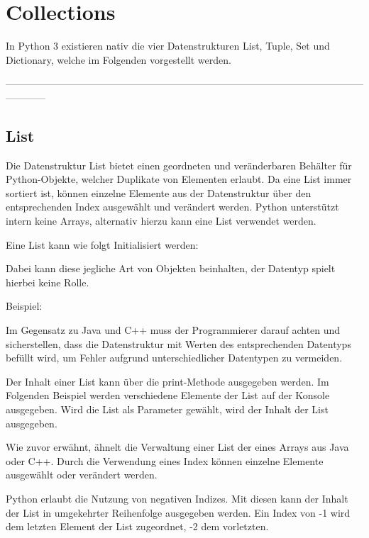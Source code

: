 \section{Collections}

In Python 3 existieren nativ die vier Datenstrukturen List, Tuple, Set und Dictionary, welche im Folgenden vorgestellt werden.

------------------------------------------------------------------------------------------------------------------------
\subsection{List}
Die Datenstruktur List bietet einen geordneten und veränderbaren Behälter für Python-Objekte, welcher  Duplikate von Elementen erlaubt. Da eine List immer sortiert ist, können einzelne Elemente aus der Datenstruktur über den entsprechenden Index ausgewählt und verändert werden. Python unterstützt intern keine Arrays, alternativ hierzu kann eine List verwendet werden.

Eine List kann wie folgt Initialisiert werden:


Dabei kann diese jegliche Art von Objekten beinhalten, der Datentyp spielt hierbei keine Rolle. 

Beispiel:



Im Gegensatz zu Java und C++ muss der Programmierer darauf achten und sicherstellen, dass die Datenstruktur mit Werten des entsprechenden Datentyps befüllt wird, um Fehler aufgrund unterschiedlicher Datentypen zu vermeiden.

Der Inhalt einer List kann über die print-Methode ausgegeben werden. Im Folgenden Beispiel werden verschiedene Elemente der List auf der Konsole ausgegeben.
Wird die List als Parameter gewählt, wird der Inhalt der List ausgegeben.


Wie zuvor erwähnt, ähnelt die Verwaltung einer List der eines Arrays aus Java oder C++. Durch die Verwendung eines Index können einzelne Elemente ausgewählt oder verändert werden.


Python erlaubt die Nutzung von negativen Indizes. Mit diesen kann der Inhalt der List in umgekehrter Reihenfolge ausgegeben werden. Ein Index von -1 wird dem letzten Element der List zugeordnet, -2 dem vorletzten.

    

